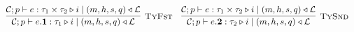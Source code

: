\documentclass[fleqn]{article}
\begin{document}
\[\begin{array}{l}
\infer[\textsc{TyFst}]{\jtygc{\mathcal{C};p }{ e.\mathbf{1} }{ \tau_1 }{ i }{ m}{h}{s}{q}{\mathcal{L}} }{\jtygc{\mathcal{C};p }{ e }{ \tau_1 \times \tau_2 }{ i }{ m}{h}{s}{q}{\mathcal{L}} } \hspace{1em}

\infer[\textsc{TySnd}]{\jtygc{\mathcal{C};p }{ e.\mathbf{2} }{ \tau_2 }{ i }{ m}{h}{s}{q}{\mathcal{L}} }{\jtygc{\mathcal{C};p }{ e }{ \tau_1 \times \tau_2 }{ i }{ m}{h}{s}{q}{\mathcal{L}} } \\









\end{array}\]
\end{document}
